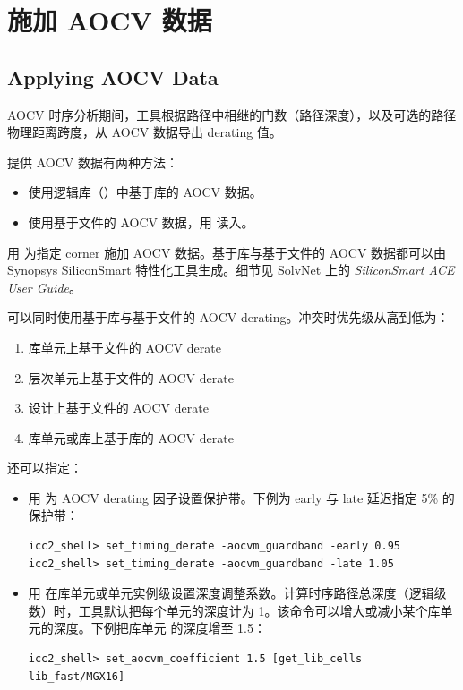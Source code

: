 \section{施加 AOCV 数据}
\subsection*{Applying AOCV Data}

AOCV 时序分析期间，工具根据路径中相继的门数（路径深度），以及可选的路径物理距离跨度，从 AOCV 数据导出 derating 值。

提供 AOCV 数据有两种方法：
\begin{itemize}
  \item 使用逻辑库（）中基于库的 AOCV 数据。
  \item 使用基于文件的 AOCV 数据，用  读入。
\end{itemize}

用  为指定 corner 施加 AOCV 数据。基于库与基于文件的 AOCV 数据都可以由 Synopsys SiliconSmart 特性化工具生成。细节见 SolvNet 上的 \textit{SiliconSmart ACE User Guide}。

可以同时使用基于库与基于文件的 AOCV derating。冲突时优先级从高到低为：
\begin{enumerate}
  \item 库单元上基于文件的 AOCV derate
  \item 层次单元上基于文件的 AOCV derate
  \item 设计上基于文件的 AOCV derate
  \item 库单元或库上基于库的 AOCV derate
\end{enumerate}

还可以指定：
\begin{itemize}
  \item 用  为 AOCV derating 因子设置保护带。下例为 early 与 late 延迟指定 5\% 的保护带：
\begin{lstlisting}
icc2_shell> set_timing_derate -aocvm_guardband -early 0.95
icc2_shell> set_timing_derate -aocvm_guardband -late 1.05
\end{lstlisting}
  \item 用  在库单元或单元实例级设置深度调整系数。计算时序路径总深度（逻辑级数）时，工具默认把每个单元的深度计为 1。该命令可以增大或减小某个库单元的深度。下例把库单元  的深度增至 1.5：
\begin{lstlisting}
icc2_shell> set_aocvm_coefficient 1.5 [get_lib_cells lib_fast/MGX16]
\end{lstlisting}
\end{itemize}

